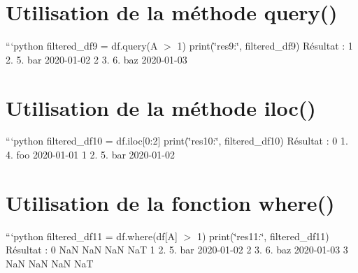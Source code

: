 \section*{Utilisation de la méthode query()}

```python filtered\+\_\+df9 = df.\+query(\textquotesingle{}A $>$ 1\textquotesingle{}) print(\char`\"{}res9\+:\char`\"{}, filtered\+\_\+df9) Résultat \+: 1 2. 5. bar 2020-\/01-\/02 2 3. 6. baz 2020-\/01-\/03

\section*{Utilisation de la méthode iloc()}

```python filtered\+\_\+df10 = df.\+iloc\mbox{[}0\+:2\mbox{]} print(\char`\"{}res10\+:\char`\"{}, filtered\+\_\+df10) Résultat \+: 0 1. 4. foo 2020-\/01-\/01 1 2. 5. bar 2020-\/01-\/02

\section*{Utilisation de la fonction where()}

```python filtered\+\_\+df11 = df.\+where(df\mbox{[}\textquotesingle{}A\textquotesingle{}\mbox{]} $>$ 1) print(\char`\"{}res11\+:\char`\"{}, filtered\+\_\+df11) Résultat \+: 0 NaN NaN NaN NaT 1 2. 5. bar 2020-\/01-\/02 2 3. 6. baz 2020-\/01-\/03 3 NaN NaN NaN NaT 